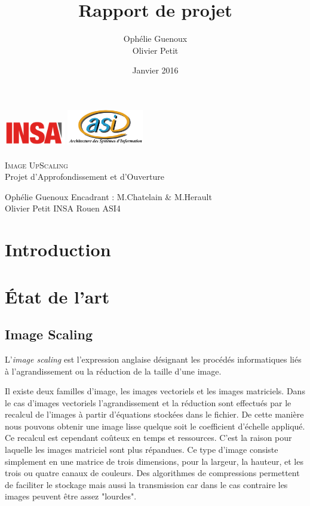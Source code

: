 \documentclass[12pt, a4paper]{article}
\title{Rapport de projet}
\author{Ophélie Guenoux \\Olivier Petit}
\date{Janvier 2016}
\begin{document}
\makeatletter
\begin{titlepage}
  \begin{center}
      \includegraphics[width=0.20\textwidth]{Images/Logo_INSA.png}
      \hfill
      \includegraphics[width=0.25\textwidth]{Images/logoasi.png}\\
    \vspace{1cm}
		\Huge \underline{\@title} 
			\\ \textsc{Image UpScaling}
			\\ \Large Projet d'Approfondissement et d'Ouverture
			\vspace{1cm}
			\begin{figure}[h!]
				\centering
			\end{figure}
	\vspace{1cm}
	\end{center}
	\raggedright
	\large Ophélie Guenoux \hfill Encadrant : M.Chatelain \& M.Herault
	\\Olivier Petit \hfill INSA Rouen ASI4
	
\end{titlepage}

\newpage
\tableofcontents
\newpage
\section*{Introduction}

\section{État de l'art}

\subsection{Image Scaling}
L'\textit{image scaling} est l'expression anglaise désignant les procédés informatiques liés à l'agrandissement ou la réduction de la taille d'une image.

Il existe deux familles d'image, les images vectoriels et les images matriciels. Dans le cas d'images vectoriels l'agrandissement et la réduction sont effectués par le recalcul de l'images à partir d'équations stockées dans le fichier. De cette manière nous pouvons obtenir une image lisse quelque soit le coefficient d'échelle appliqué. Ce recalcul est cependant coûteux en temps et ressources. C'est la raison pour laquelle les images matriciel sont plus répandues. Ce type d'image consiste simplement en une matrice de trois dimensions, pour la largeur, la hauteur, et les trois ou quatre canaux de couleurs. Des algorithmes de compressions permettent de faciliter le stockage mais aussi la transmission car dans le cas contraire les images peuvent être assez "lourdes".
\end{document}
